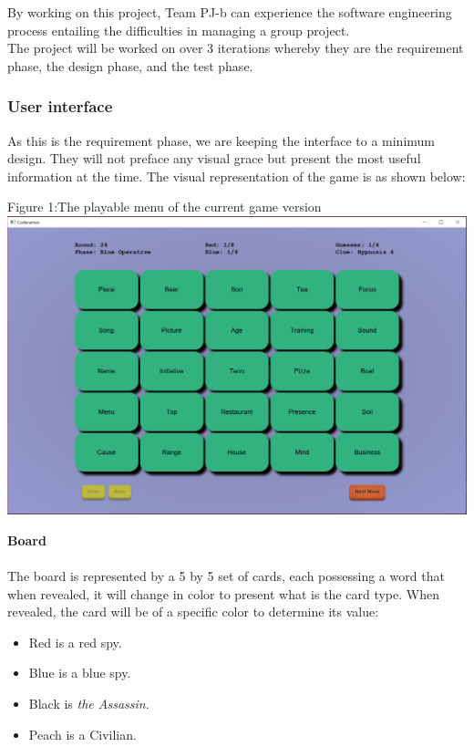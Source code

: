\documentclass[10pt, a4paper]{article}
\begin{document}
	By working on this project, Team PJ-b can experience the software engineering process entailing the difficulties in managing a group project.\\
	
	The project will be worked on over 3 iterations whereby they are the requirement phase, the design phase, and the test phase.
	
		\subsubsection{User interface}
		
		As this is the requirement phase, we are keeping the interface to a minimum design. They will not preface any visual grace but present the most useful information at the time. The visual representation of the game is as shown below:\\
		
		\begin{center}
			Figure 1:The playable menu of the current game version
			\includegraphics[scale=0.2]{Images/game_interface.png}
			
		\end{center}
	
		\textbf{Board}\\
		\\
		The board is represented by a 5 by 5 set of cards, each possessing a word that when revealed, it will change in color to present what is the card type. When revealed, the card will be of a specific color to determine its value:  
		    \begin{itemize}
		        \item Red is a red spy.
		        \item Blue is a blue spy.
		        \item Black is \textit{the Assassin}.
		        \item Peach is a Civilian.
		    \end{itemize}
		    
\end{document}
